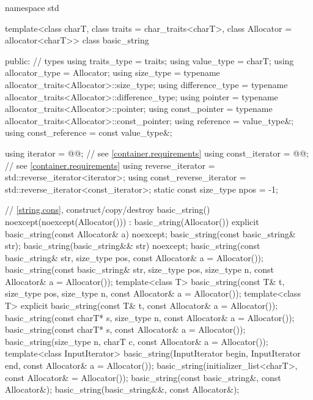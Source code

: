 %
%
%
%
%
%
%
%
%
%
%
%
%
%
\begin{codeblock}
namespace std {
  template<class charT, class traits = char_traits<charT>,
           class Allocator = allocator<charT>>
  class basic_string {
  public:
    // types
    using traits_type            = traits;
    using value_type             = charT;
    using allocator_type         = Allocator;
    using size_type              = typename allocator_traits<Allocator>::size_type;
    using difference_type        = typename allocator_traits<Allocator>::difference_type;
    using pointer                = typename allocator_traits<Allocator>::pointer;
    using const_pointer          = typename allocator_traits<Allocator>::const_pointer;
    using reference              = value_type&;
    using const_reference        = const value_type&;

    using iterator               = @@; // see \ref{container.requirements}
    using const_iterator         = @@; // see \ref{container.requirements}
    using reverse_iterator       = std::reverse_iterator<iterator>;
    using const_reverse_iterator = std::reverse_iterator<const_iterator>;
    static const size_type npos  = -1;

    // \ref{string.cons}, construct/copy/destroy
    basic_string() noexcept(noexcept(Allocator())) : basic_string(Allocator()) { }
    explicit basic_string(const Allocator& a) noexcept;
    basic_string(const basic_string& str);
    basic_string(basic_string&& str) noexcept;
    basic_string(const basic_string& str, size_type pos, const Allocator& a = Allocator());
    basic_string(const basic_string& str, size_type pos, size_type n,
                 const Allocator& a = Allocator());
    template<class T>
      basic_string(const T& t, size_type pos, size_type n, const Allocator& a = Allocator());
    template<class T>
      explicit basic_string(const T& t, const Allocator& a = Allocator());
    basic_string(const charT* s, size_type n, const Allocator& a = Allocator());
    basic_string(const charT* s, const Allocator& a = Allocator());
    basic_string(size_type n, charT c, const Allocator& a = Allocator());
    template<class InputIterator>
      basic_string(InputIterator begin, InputIterator end, const Allocator& a = Allocator());
    basic_string(initializer_list<charT>, const Allocator& = Allocator());
    basic_string(const basic_string&, const Allocator&);
    basic_string(basic_string&&, const Allocator&);

}}
\end{codeblock}
